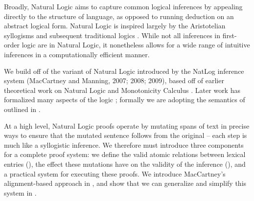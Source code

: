 Broadly, Natural Logic aims to capture common logical
  inferences by appealing directly to the structure of language,
  as opposed to running deduction on an abstract logical form.
Natural Logic is inspired largely by the Aristotelian
  syllogisms and subsequent traditional logics
  \cite{key:2008vanbenthem-natlog}.
While not all inferences in first-order logic are in Natural Logic,
  it nonetheless allows for a wide range of intuitive inferences in
  a computationally efficient manner.

We build off of the variant of Natural Logic introduced by
  the NatLog inference system (MacCartney and Manning, 2007; 2008; 2009),
  \nocite{key:2007maccartney-natlog}
  \nocite{key:2008maccartney-natlog}
  \nocite{key:2009maccartney-natlog}
  based off of earlier theoretical work on Natural Logic and 
  Monotonicity Calculus
  \cite{key:1986benthem-natlog,key:1991valencia-natlog}.
Later work has formalized many aspects of the logic
  \cite{key:2012icard-natlog,key:2013djalali-natlog};
  formally we are adopting the semantics of outlined in
  .

At a high level, Natural Logic proofs operate by mutating spans of text
  in precise ways to ensure that the mutated sentence follows from the
  original -- each step is much like a syllogistic inference.
We therefore must introduce three components for a complete proof system:
  we define the valid atomic relations between lexical entries
  (), the effect these mutations have
  on the validity of the inference (),
  and a practical system for executing these proofs.
We introduce MacCartney's alignment-based approach in
  , and show that we can generalize and
  simplify this system in .

